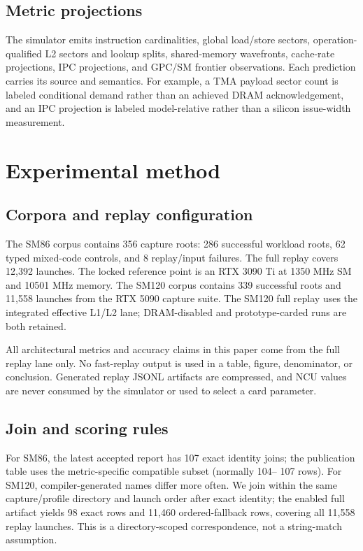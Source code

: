 \documentclass[10pt,letterpaper]{article}
\begin{document}
\subsection{Metric projections}

The simulator emits instruction cardinalities, global load/store sectors,
operation-qualified L2 sectors and lookup splits, shared-memory wavefronts,
cache-rate projections, IPC projections, and GPC/SM frontier observations.
Each prediction carries its source and semantics.  For example, a TMA payload
sector count is labeled conditional demand rather than an achieved DRAM
acknowledgement, and an IPC projection is labeled model-relative rather than a
silicon issue-width measurement.

\section{Experimental method}
\label{sec:method}

\subsection{Corpora and replay configuration}

The SM86 corpus contains 356 capture roots: 286 successful workload roots, 62
typed mixed-code controls, and 8 replay/input failures.  The full replay covers
12,392 launches.  The locked reference point is an RTX 3090 Ti at 1350 MHz SM
and 10501 MHz memory.  The SM120 corpus contains 339 successful roots and
11,558 launches from the RTX 5090 capture suite.  The SM120 full replay uses
the integrated effective L1/L2 lane; DRAM-disabled and prototype-carded runs
are both retained.

All architectural metrics and accuracy claims in this paper come from the
full replay lane only.  No fast-replay output is used in a table, figure,
denominator, or conclusion.  Generated replay JSONL artifacts are compressed,
and NCU values are never consumed by the simulator or used to select a card
parameter.

\subsection{Join and scoring rules}

For SM86, the latest accepted report has 107 exact identity joins; the
publication table uses the metric-specific compatible subset (normally 104--
107 rows).  For SM120, compiler-generated names differ more often.  We join
within the same capture/profile directory and launch order after exact identity;
the enabled full artifact yields 98 exact rows and 11,460 ordered-fallback rows,
covering all 11,558 replay launches.  This is a directory-scoped
correspondence, not a string-match assumption.
\end{document}
